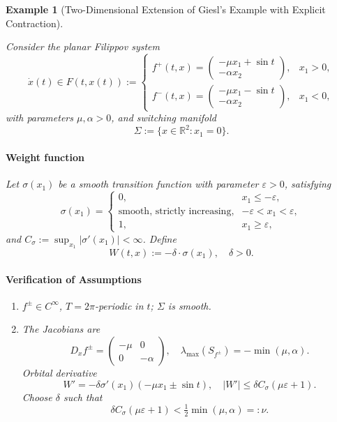 \documentclass[11pt]{article}
\newtheorem{example}{Example}
\begin{document}
\begin{example}[Two-Dimensional Extension of Giesl’s Example \cite{giesl2005} with Explicit Contraction]
	\label{ex:giesl_2d_modified}
	
Consider the planar Filippov system
	\begin{equation} \label{eq:giesl_system_def}
		\dot{x}(t) \in F(t,x(t)) :=
		\begin{cases}
			f^+(t,x) = \begin{pmatrix} -\mu x_1 + \sin t \\ -\alpha x_2 \end{pmatrix}, & x_1 > 0, \\
			f^-(t,x) = \begin{pmatrix} -\mu x_1 - \sin t \\ -\alpha x_2 \end{pmatrix}, & x_1 < 0,
		\end{cases}
	\end{equation}
with parameters $\mu, \alpha > 0$, and switching manifold
	\[
	\Sigma := \{ x \in \mathbb{R}^2 : x_1 = 0 \}.
	\]
	
	\paragraph{Weight function}
	Let $\sigma(x_1)$ be a smooth transition function with parameter $\varepsilon > 0$, satisfying
	\[
	\sigma(x_1) =
	\begin{cases}
		0, & x_1 \leq -\varepsilon, \\
		\text{smooth, strictly increasing}, & -\varepsilon < x_1 < \varepsilon, \\
		1, & x_1 \geq \varepsilon,
	\end{cases}
	\]
	and $C_\sigma := \sup_{x_1} |\sigma'(x_1)| < \infty$. Define
	\[
	W(t,x) := -\delta \cdot \sigma(x_1), \quad \delta > 0.
	\]
	
	\paragraph{Verification of Assumptions}
	\begin{enumerate}
		\item[(A1)] \( f^\pm \in C^\infty \), \( T = 2\pi \)-periodic in $t$; $\Sigma$ is smooth.
		\item[(A2)] The Jacobians are
		\[
		D_x f^\pm = \begin{pmatrix} -\mu & 0 \\ 0 & -\alpha \end{pmatrix}, \quad \lambda_{\max}(S_{f^\pm}) = -\min(\mu,\alpha).
		\]
		Orbital derivative
		\[
		W' = -\delta \sigma'(x_1) (-\mu x_1 \pm \sin t), \quad |W'| \leq \delta C_\sigma(\mu\varepsilon + 1).
		\]
		Choose $\delta$ such that
		\[
		\delta C_\sigma(\mu \varepsilon + 1) < \tfrac{1}{2} \min(\mu,\alpha) =: \nu.
		\]
		

\end{enumerate}
\end{example}
\end{document}
